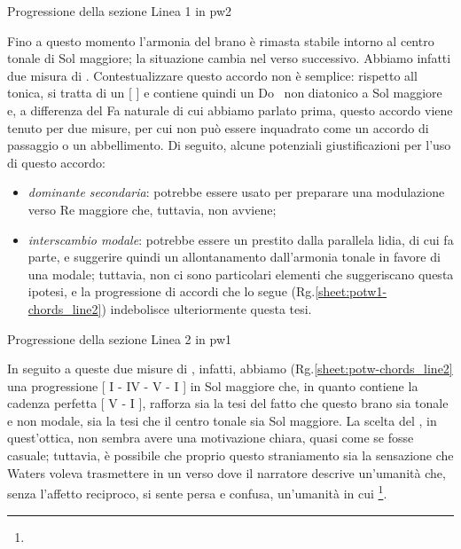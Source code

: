 \documentclass[class=book, crop=false, oneside, 12pt]{standalone}
\begin{document}
    \begin{sheet}{Progressione della sezione Linea 1 in \acrshort{pw2}}
        \label{sheet:potw2-chords_line1}
    \end{sheet}
    
    Fino a questo momento l'armonia del brano è rimasta stabile intorno al centro tonale di Sol maggiore; la situazione cambia nel verso successivo. Abbiamo infatti due misura di . Contestualizzare questo accordo non è semplice: rispetto all tonica, si tratta di un [  ] e contiene quindi un Do\sharp~ non diatonico a Sol maggiore e, a differenza del Fa naturale di cui abbiamo parlato prima, questo accordo viene tenuto per due misure, per cui non può essere inquadrato come un accordo di passaggio o un abbellimento. Di seguito, alcune potenziali giustificazioni per l'uso di questo accordo:
    \begin{itemize}
        \item \emph{dominante secondaria}:  potrebbe essere usato per preparare una modulazione verso Re maggiore che, tuttavia, non avviene;
        \item \emph{interscambio modale}:  potrebbe essere un prestito dalla parallela lidia, di cui fa parte, e suggerire quindi un allontanamento dall'armonia tonale in favore di una modale; tuttavia, non ci sono particolari elementi che suggeriscano questa ipotesi, e la progressione di accordi che lo segue (Rg.\ref{sheet:potw1-chords_line2}) indebolisce ulteriormente questa tesi.
    \end{itemize}

    \begin{sheet}{Progressione della sezione Linea 2 in \acrshort{pw1}}
        \label{sheet:potw1-chords_line2}
    \end{sheet}

    In seguito a queste due misure di , infatti, abbiamo (Rg.\ref{sheet:potw-chords_line2} una progressione [ I - IV - V - I ] in Sol maggiore che, in quanto contiene la cadenza perfetta [ V - I ], rafforza sia la tesi del fatto che questo brano sia tonale e non modale, sia la tesi che il centro tonale sia Sol maggiore. La scelta del , in quest'ottica, non sembra avere una motivazione chiara, quasi come se fosse casuale; tuttavia, è possibile che proprio questo straniamento sia la sensazione che Waters voleva trasmettere in un verso dove il narratore descrive un'umanità che, senza l'affetto reciproco, si sente persa e confusa, un'umanità in cui \footnote{}.
\end{document}
